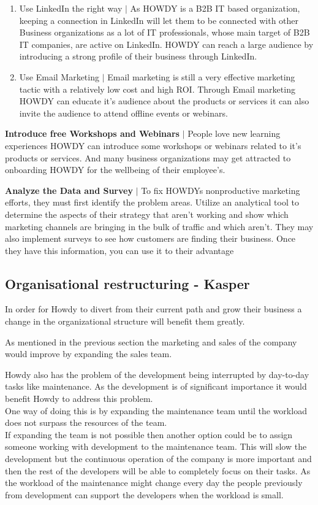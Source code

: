 \begin{enumerate}
    \item Use LinkedIn the right way $|$ As HOWDY is a B2B IT based organization, keeping a connection in LinkedIn will let them to be connected with other Business organizations as a lot of IT professionals, whose main target of B2B IT companies, are active on LinkedIn. HOWDY can reach a large audience by introducing a strong profile of their business through LinkedIn.
    \item Use Email Marketing $|$ Email marketing is still a very effective marketing tactic with a relatively low cost and high ROI. Through Email marketing HOWDY can educate it’s audience about the products or services it can also invite the audience to attend offline events or webinars.
\end{enumerate}

\noindent \textbf{Introduce free Workshops and Webinars} $|$ People love new learning experiences HOWDY can introduce some workshops or webinars related to it’s products or services. And many business organizations may get attracted to onboarding HOWDY for the wellbeing of their employee’s.

\noindent \textbf{Analyze the Data and Survey} $|$ To fix HOWDYs nonproductive marketing efforts, they must first identify the problem areas. Utilize an analytical tool to determine the aspects of their strategy that aren’t working and show which marketing channels are bringing in the bulk of traffic and which aren’t. They may also implement surveys to see how customers are finding their business. Once they have this information, you can use it to their advantage
 
\subsection{Organisational restructuring - Kasper}
In order for Howdy to divert from their current path and grow their business a change in the organizational structure will benefit them greatly.

\noindent As mentioned in the previous section the marketing and sales of the company would improve by expanding the sales team.

\noindent Howdy also has the problem of the development being interrupted by day-to-day tasks like maintenance. As the development is of significant importance it would benefit Howdy to address this problem.\\
\noindent One way of doing this is by expanding the maintenance team until the workload does not surpass the resources of the team.\\
\noindent If expanding the team is not possible then another option could be to assign someone working with development to the maintenance team. This will slow the development but the continuous operation of the company is more important and then the rest of the developers will be able to completely focus on their tasks. As the workload of the maintenance might change every day the people previously from development can support the developers when the workload is small.

